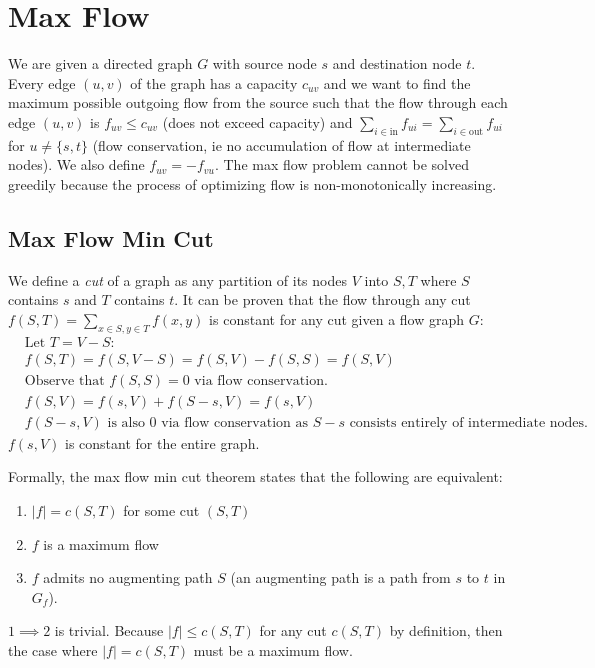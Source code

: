 \documentclass[10pt]{article}
\begin{document}
\section{Max Flow}
We are given a directed graph $G$ with source node $s$ and destination node $t$. Every edge $(u, v)$ of the graph has a capacity $c_{uv}$ and we want to find the maximum possible outgoing flow from the source such that the flow through each edge $(u, v)$ is $f_{uv} \leq c_{uv}$ (does not exceed capacity) and $\sum_{i \in \text{in}} f_{ui} = \sum_{i \in \text{out}} f_{ui}$ for $u \neq \{s, t\}$ (flow conservation, ie no accumulation of flow at intermediate nodes). We also define $f_{uv} = - f_{vu}$. The max flow problem cannot be solved greedily because the process of optimizing flow is non-monotonically increasing.

\subsection*{Max Flow Min Cut}
We define a \textit{cut} of a graph as any partition of its nodes $V$ into $S, T$ where $S$ contains $s$ and $T$ contains $t$. It can be proven that the flow through any cut $f(S, T) = \sum_{x \in S, y \in T} f(x, y)$ is constant for any cut given a flow graph $G$:
\begin{align*}
    &\text{Let }T = V - S:\\
    &f(S, T) = f(S, V - S) = f(S, V) - f(S, S) = f(S, V)\\
    &\text{Observe that } f(S, S) = 0 \text{ via flow conservation.}\\
    &f(S, V) = f(s, V) + f(S - s, V) = f(s, V)\\
    &f(S - s, V) \text{ is also 0 via flow conservation as }S-s\text{ consists entirely of intermediate nodes.}
\end{align*}
$f(s, V)$ is constant for the entire graph.

Formally, the max flow min cut theorem states that the following are equivalent:
\begin{enumerate}
    \item $|f| = c(S, T)$ for some cut $(S, T)$
    \item $f$ is a maximum flow
    \item $f$ admits no augmenting path $S$ (an augmenting path is a path from $s$ to $t$ in $G_f$).
\end{enumerate}

$1 \implies 2$ is trivial. Because $|f| \leq c(S, T)$ for any cut $c(S, T)$ by definition, then the case where $|f| = c(S, T)$ must be a maximum flow.
\end{document}
